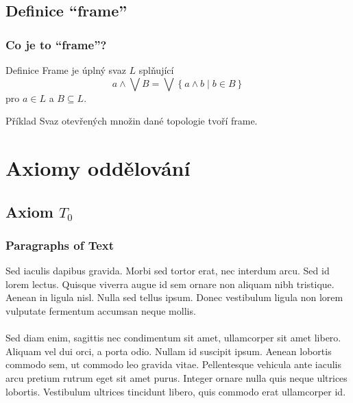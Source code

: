 \documentclass[mathserif]{beamer}
\begin{document}

\subsection{Definice ``frame''}

\begin{frame}
\frametitle{Co je to ``frame''?}
\pause
\begin{block}{Definice}
  {\color{blue}Frame} je úplný svaz $L$ splňující
  \begin{equation} \tag{Frm}
    a \wedge \bigvee B
    = \bigvee \left\{ a \wedge b \mid b \in B \right\}
  \end{equation}
  pro $a \in L$ a $B \subseteq L$.
\end{block}
\pause

\begin{exampleblock}{Příklad}
  Svaz otevřených množin dané topologie tvoří frame.
\end{exampleblock}
\end{frame}

\section{Axiomy oddělování}

\subsection{Axiom $T_0$} %

\begin{frame}
\frametitle{Paragraphs of Text}
Sed iaculis dapibus gravida. Morbi sed tortor erat, nec interdum arcu. Sed id lorem lectus. Quisque viverra augue id sem ornare non aliquam nibh tristique. Aenean in ligula nisl. Nulla sed tellus ipsum. Donec vestibulum ligula non lorem vulputate fermentum accumsan neque mollis.\\~\\

Sed diam enim, sagittis nec condimentum sit amet, ullamcorper sit amet libero. Aliquam vel dui orci, a porta odio. Nullam id suscipit ipsum. Aenean lobortis commodo sem, ut commodo leo gravida vitae. Pellentesque vehicula ante iaculis arcu pretium rutrum eget sit amet purus. Integer ornare nulla quis neque ultrices lobortis. Vestibulum ultrices tincidunt libero, quis commodo erat ullamcorper id.
\end{frame}
\end{document}
